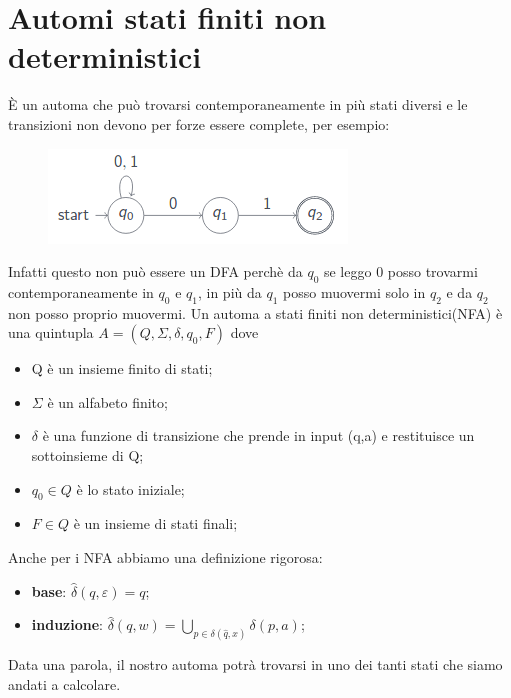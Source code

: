 \chapter{Automi stati finiti non deterministici}
È un automa che può trovarsi contemporaneamente in più stati diversi e le 
transizioni non devono per forze essere complete, per esempio: 

\begin{figure}[h]
\centering 
\includegraphics[scale=0.5]{Immagini/NFA.png}
\end{figure}

Infatti questo non può essere un DFA perchè da $q_0$ se leggo 0 posso trovarmi
contemporaneamente in $q_0$ e $q_1$, in più da $q_1$ posso muovermi solo in $q_2$ 
e da $q_2$ non posso proprio muovermi.
Un automa a stati finiti non deterministici(NFA) è una quintupla $A=(Q, \Sigma, 
\delta, q_0, F)$ dove
\begin{itemize}
\item Q è un insieme finito di stati;
\item $\Sigma$ è un alfabeto finito;
\item $\delta$ è una funzione di transizione che prende in input (q,a) e 
restituisce un sottoinsieme di Q;
\item $q_0 \in Q$ è lo stato iniziale;
\item $F \in Q$ è un insieme di stati finali;
\end{itemize}
Anche per i NFA abbiamo una definizione rigorosa:
\begin{itemize}
\item \textbf{base}: $\widehat{\delta}(q, \varepsilon)={q}$;
\item \textbf{induzione}: $\widehat{\delta}(q,w)=\bigcup_{p \in \delta 
(\widehat{q},x)}^{} \delta(p,a)$;
\end{itemize}
Data una parola, il nostro automa potrà trovarsi in uno dei tanti stati
che siamo andati a calcolare.